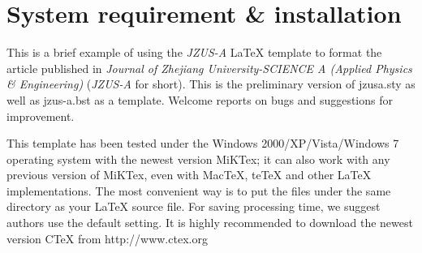 \documentclass[twoside,twocolumn]{article}
\begin{document}






\articleType{}

\maketitle

\section{System requirement \& installation}\label{sec:introduction}
  This is a brief example of using the \emph{JZUS-A} LaTeX template to format the article published in \emph{Journal of Zhejiang University-SCIENCE A (Applied Physics {\sf \slshape \&} Engineering)} (\emph{JZUS-A} for short). This is the preliminary version of jzusa.sty as well as jzus-a.bst as a template. Welcome reports on bugs and suggestions for improvement.

This template has been tested under the Windows 2000/XP/Vista/Windows 7 operating system with the newest version MiKTex; it can also work with any previous version of MiKTex, even with MacTeX, teTeX and other LaTeX implementations. The most convenient way is to put the files under the same directory as your LaTeX source file. For saving processing time, we suggest authors use the default setting. It is highly recommended to download the newest version CTeX from http://www.ctex.org
\end{document}
